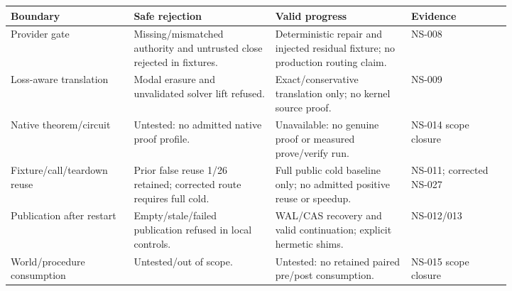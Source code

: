 \begin{tabular}{p{0.18\linewidth}p{0.24\linewidth}p{0.23\linewidth}p{0.17\linewidth}}
\hline
Boundary & Safe rejection & Valid progress & Evidence \\
\hline
Provider gate & Missing/mismatched authority and untrusted close rejected in fixtures. & Deterministic repair and injected residual fixture; no production routing claim. & NS-008 \\
Loss-aware translation & Modal erasure and unvalidated solver lift refused. & Exact/conservative translation only; no kernel source proof. & NS-009 \\
Native theorem/circuit & Untested: no admitted native proof profile. & Unavailable: no genuine proof or measured prove/verify run. & NS-014 scope closure \\
Fixture/\allowbreak call/\allowbreak teardown reuse & Prior false reuse 1/26 retained; corrected route requires full cold. & Full public cold baseline only; no admitted positive reuse or speedup. & NS-011; corrected NS-027 \\
Publication after restart & Empty/stale/failed publication refused in local controls. & WAL/CAS recovery and valid continuation; explicit hermetic shims. & NS-012/013 \\
World/procedure consumption & Untested/out of scope. & Untested: no retained paired pre/post consumption. & NS-015 scope closure \\
\hline
\end{tabular}
